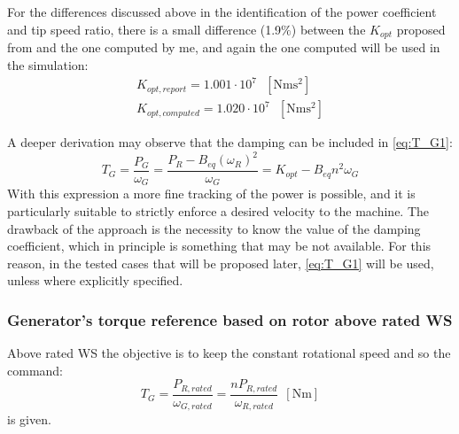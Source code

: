  For the differences discussed above in the identification of the power coefficient and tip speed ratio, there is a small difference (1.9$\%$) between the $K_{opt}$ proposed from \cite{DTU_Wind_Energy_Report-I-0092} and the one computed by me, and again the one computed will be used in the simulation:
 \begin{gather*}
     K_{opt, report} = 1.001 \cdot 10^7 \ \ \ \left[\si{\newton\meter\square\second}\right] \\
     K_{opt, computed} = 1.020 \cdot 10^7 \ \ \ \left[\si{\newton\meter\square\second}\right] 
 \end{gather*}

 A deeper derivation may observe that the damping can be included in \autoref{eq:T_G1}:
 \begin{equation}
  T_G = \frac{P_G}{\omega_G} = \frac{P_R-B_{eq}(\omega_R)^2}{\omega_G} = K_{opt} - B_{eq}n^2\omega_G  
  \label{eq:T_G5}
 \end{equation}
 With this expression a more fine tracking of the power is possible, and it is particularly suitable to strictly enforce a desired velocity to the machine. The drawback of the approach is the necessity to know the value of the damping coefficient, which in principle is something that may be not available. For this reason, in the tested cases that will be proposed later, \autoref{eq:T_G1} will be used, unless where explicitly specified.

\subsubsection[Above WS]{Generator's torque reference based on rotor above rated WS}
Above rated WS the objective is to keep the constant rotational speed and so the command:
\begin{equation}
    T_G = \frac{P_{R,rated}}{\omega_{G,rated}} = \frac{nP_{R,rated}}{\omega_{R,rated}}\ \ \left[\si{\newton\meter}\right]
    \label{eq:T_G3}
\end{equation}
is given.

